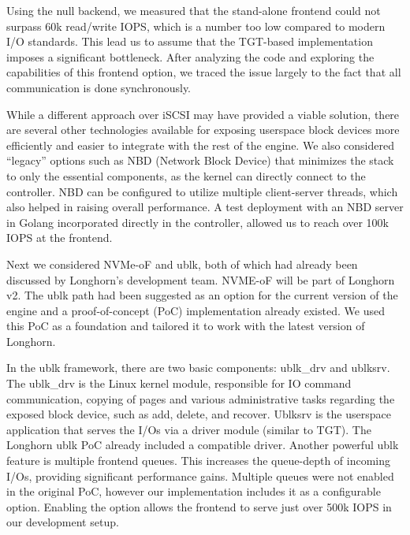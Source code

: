 Using the null backend, we measured that the stand-alone frontend could not surpass 60k read/write IOPS, which is a number too low compared to modern I/O standards. This lead us to assume that the TGT-based implementation imposes a significant bottleneck. After analyzing the code and exploring the capabilities of this frontend option, we traced the issue largely to the fact that all communication is done synchronously.

While a different approach over iSCSI may have provided a viable solution, there are several other technologies available for exposing userspace block devices more efficiently and easier to integrate with the rest of the engine. We also considered ``legacy'' options such as NBD (Network Block Device) \cite{nbd} that minimizes the stack to only the essential components, as the kernel can directly connect to the controller. NBD can be configured to utilize multiple client-server threads, which also helped in raising overall performance. A test deployment with an NBD server in Golang incorporated directly in the controller, allowed us to reach over 100k IOPS at the frontend.

Next we considered NVMe-oF and ublk, both of which had already been discussed by Longhorn’s development team. NVME-oF will be part of Longhorn v2. The ublk path had been suggested as an option for the current version of the engine and a proof-of-concept (PoC) implementation already existed. We used this PoC as a foundation and tailored it to work with the latest version of Longhorn.

In the ublk framework, there are two basic components: ublk\_drv and ublksrv. The ublk\_drv is the Linux kernel module, responsible for IO command communication, copying of pages and various administrative tasks regarding the exposed block device, such as add, delete, and recover. Ublksrv is the userspace application that serves the I/Os via a driver module (similar to TGT). The Longhorn ublk PoC already included a compatible driver. Another powerful ublk feature is multiple frontend queues. This increases the queue-depth of incoming I/Os, providing significant performance gains. Multiple queues were not enabled in the original PoC, however our implementation includes it as a configurable option. Enabling the option allows the frontend to serve just over 500k IOPS in our development setup.

